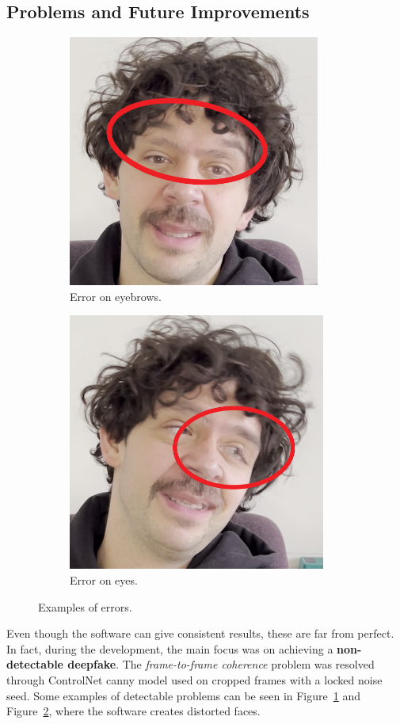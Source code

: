 \documentclass[preprint]{elsarticle}
\begin{document}
\subsection{Problems and Future Improvements}

\begin{figure}[t]
	\centering
	\begin{subfigure}[b]{0.5\textwidth}
		\centering
		\includegraphics[scale=0.34]{img/project_img/error-eyebrows.png}
		\caption{Error on eyebrows.}\label{fig:error-eyebrows}
	\end{subfigure}%
	\hfill
	\begin{subfigure}[b]{0.5\textwidth}
		\centering
		\includegraphics[scale=0.34]{img/project_img/error-eyes.png}
		\caption{Error on eyes.}\label{fig:error-eyes}
	\end{subfigure}
	\caption{Examples of errors.}\label{fig:errors}
\end{figure}

Even though the software can give consistent results, these are far from perfect. In fact, during the development, the main focus was on achieving a \textbf{non-detectable deepfake}. The \emph{frame-to-frame coherence} problem was resolved through ControlNet  canny model used on cropped frames with a locked noise seed.  Some examples of detectable problems can be seen in Figure~\ref{fig:error-eyebrows} and Figure~\ref{fig:error-eyes},  where the software creates distorted faces. 
\end{document}
